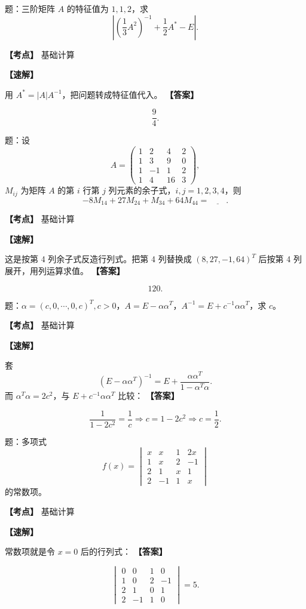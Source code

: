 ﻿\documentclass[11pt,a4paper,UTF8]{ctexart}
\begin{document}
\begin{answerbox}[2021--2022 填空 4]
题：三阶矩阵 $A$ 的特征值为 $1,1,2$，求
\[
\left|\left(\frac13A^2\right)^{-1}+\frac12A^*-E\right|.
\]

\textbf{【考点】} 基础计算

\textbf{【速解】}

用 $A^*=|A|A^{-1}$，把问题转成特征值代入。
\textbf{【答案】}

\[\frac94.\]
\end{answerbox}
\begin{answerbox}[2022--2023 填空 1]
题：设
\[
A=\begin{pmatrix}
1&2&4&2\\
1&3&9&0\\
1&-1&1&2\\
1&4&16&3
\end{pmatrix},
\]
$M_{ij}$ 为矩阵 $A$ 的第 $i$ 行第 $j$ 列元素的余子式，$i,j=1,2,3,4$，则
\[
-8M_{14}+27M_{24}+M_{34}+64M_{44}=\underline{\qquad}.
\]

\textbf{【考点】} 基础计算

\textbf{【速解】}

这是按第 4 列余子式反造行列式。把第 4 列替换成 $(8,27,-1,64)^T$ 后按第 4 列展开，用列运算求值。
\textbf{【答案】}

\[120.\]
\end{answerbox}
\begin{answerbox}[2022--2023 填空 2]
题：$\alpha=(c,0,\cdots,0,c)^T,c>0$，$A=E-\alpha\alpha^T$，$A^{-1}=E+c^{-1}\alpha\alpha^T$，求 $c$。

\textbf{【考点】} 基础计算

\textbf{【速解】}

套
\[
(E-\alpha\alpha^T)^{-1}
=E+\frac{\alpha\alpha^T}{1-\alpha^T\alpha}.
\]
而 $\alpha^T\alpha=2c^2$，与 $E+c^{-1}\alpha\alpha^T$ 比较：
\textbf{【答案】}

\[
\frac1{1-2c^2}=\frac1c
\Rightarrow c=1-2c^2
\Rightarrow c=\frac12.
\]
\end{answerbox}
\begin{answerbox}[2023--2024 填空 1]
题：多项式
\[
f(x)=
\begin{vmatrix}
x&x&1&2x\\
1&x&2&-1\\
2&1&x&1\\
2&-1&1&x
\end{vmatrix}
\]
的常数项。

\textbf{【考点】} 基础计算

\textbf{【速解】}

常数项就是令 $x=0$ 后的行列式：
\textbf{【答案】}

\[
\begin{vmatrix}
0&0&1&0\\
1&0&2&-1\\
2&1&0&1\\
2&-1&1&0
\end{vmatrix}=5.
\]
\end{answerbox}
\end{document}

